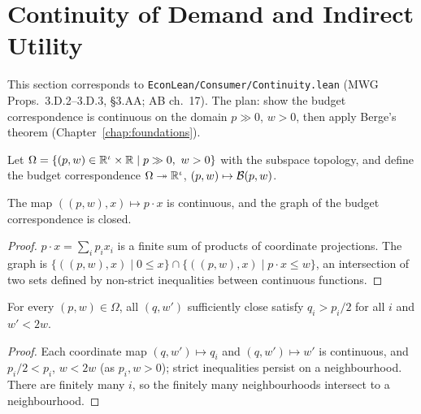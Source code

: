 \section{Continuity of Demand and Indirect Utility}
\label{sec:continuity}

This section corresponds to \texttt{EconLean/Consumer/Continuity.lean} (MWG Props.~3.D.2--3.D.3,
\S3.AA; AB ch.~17). The plan: show the budget correspondence is continuous on the domain
$p \gg 0$, $w > 0$, then apply Berge's theorem (Chapter~\ref{chap:foundations}).

\begin{definition}
\label{def:budgetCorr}
\leanok
{}
Let $\Omega = \{(p, w) \in \mathbb{R}^\iota \times \mathbb{R} \mid p \gg 0,\ w > 0\}$ with the subspace topology, and
define the budget correspondence $\Omega \twoheadrightarrow \mathbb{R}^\iota$, $(p, w) \mapsto \mathcal{B}(p, w)$.
\end{definition}

\begin{lemma}
\label{lem:closed_graph_budget}
\leanok
{}
The map $((p, w), x) \mapsto p \cdot x$ is continuous, and the graph of the budget correspondence is closed.
\end{lemma}
\begin{proof}
\leanok
$p \cdot x = \sum_i p_i x_i$ is a finite sum of products of coordinate projections. The graph is
$\{((p, w), x) \mid 0 \le x\} \cap \{((p, w), x) \mid p \cdot x \le w\}$, an intersection of two sets
defined by non-strict inequalities between continuous functions.
\end{proof}

\begin{lemma}
\label{lem:eventually_near}
\leanok
{}
For every $(p, w) \in \Omega$, all $(q, w')$ sufficiently close satisfy $q_i > p_i / 2$ for all $i$ and
$w' < 2w$.
\end{lemma}
\begin{proof}
\leanok
Each coordinate map $(q, w') \mapsto q_i$ and $(q, w') \mapsto w'$ is continuous, and $p_i / 2 < p_i$,
$w < 2w$ (as $p_i, w > 0$); strict inequalities persist on a neighbourhood. There are finitely many
$i$, so the finitely many neighbourhoods intersect to a neighbourhood.
\end{proof}

